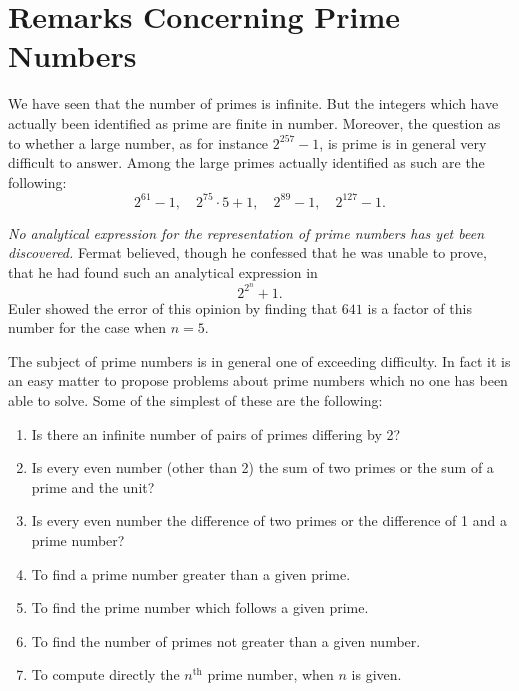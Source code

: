 \documentclass[oneside]{book}
\begin{document}
\section{Remarks Concerning Prime Numbers}\label{s13}%

We have seen that the number of primes is infinite. But the integers
which have actually been identified as prime are finite in number.
Moreover, the question as to whether a large number, as for instance
$2^{257}-1$, is prime is in general very difficult to answer. Among
the large primes actually identified as such are the following:
\begin{equation*}
2^{61}-1, \quad 2^{75} \cdot 5+1, \quad 2^{89}-1, \quad 2^{127}-1.
\end{equation*}

\emph{No analytical expression for the representation of prime
numbers has yet been discovered.} Fermat believed, though he
confessed that he was unable to prove, that he had found such an
analytical expression in
\begin{equation*}
2^{2^n} + 1.
\end{equation*}
Euler showed the error of this opinion by finding that $641$ is a
factor of this number for the case when $n = 5$.%

The subject of prime numbers is in general one of exceeding
difficulty. In fact it is an easy matter to propose problems about
prime numbers which no one has been able to solve. Some of the
simplest of these are the following:

\begin{enumerate}
\item Is there an infinite number of pairs of primes differing by
2?
\item Is every even number (other than 2) the sum of two primes or
the sum of a prime and the unit?
\item Is every even number the difference of two primes or the
difference of 1 and a prime number?
\item To find a prime number greater than a given prime.
\item To find the prime number which follows a given prime.
\item To find the number of primes not greater than a given number.
\item To compute directly the $n^\text{th}$ prime number, when $n$
is given.
\end{enumerate}
\end{document}
